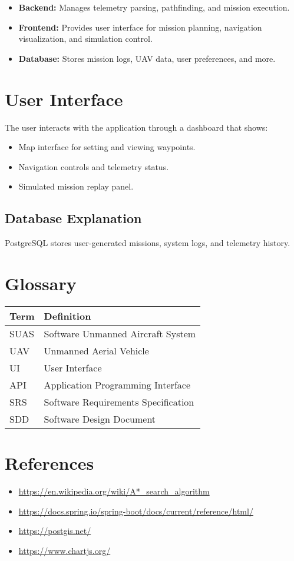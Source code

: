 \documentclass{article}
\begin{document}
\begin{itemize}
    \item \textbf{Backend:} Manages telemetry parsing, pathfinding, and mission execution.
    \item \textbf{Frontend:} Provides user interface for mission planning, navigation visualization, and simulation control.
    \item \textbf{Database:} Stores mission logs, UAV data, user preferences, and more.
\end{itemize}

\section{User Interface}
The user interacts with the application through a dashboard that shows:
\begin{itemize}
    \item Map interface for setting and viewing waypoints.
    \item Navigation controls and telemetry status.
    \item Simulated mission replay panel.
\end{itemize}

\subsection{Database Explanation}
PostgreSQL stores user-generated missions, system logs, and telemetry history.

\section{Glossary}
\begin{longtable}{| m{4cm} | m{10cm} |}
\hline
\textbf{Term} & \textbf{Definition} \\
\hline
SUAS & Software Unmanned Aircraft System \\
\hline
UAV & Unmanned Aerial Vehicle \\
\hline
UI & User Interface \\
\hline
API & Application Programming Interface \\
\hline
SRS & Software Requirements Specification \\
\hline
SDD & Software Design Document \\
\hline
\end{longtable}

\section{References}
\begin{itemize}
    \item \url{https://en.wikipedia.org/wiki/A*_search_algorithm}
    \item \url{https://docs.spring.io/spring-boot/docs/current/reference/html/}
    \item \url{https://postgis.net/}
    \item \url{https://www.chartjs.org/}
\end{itemize}
\end{document}
